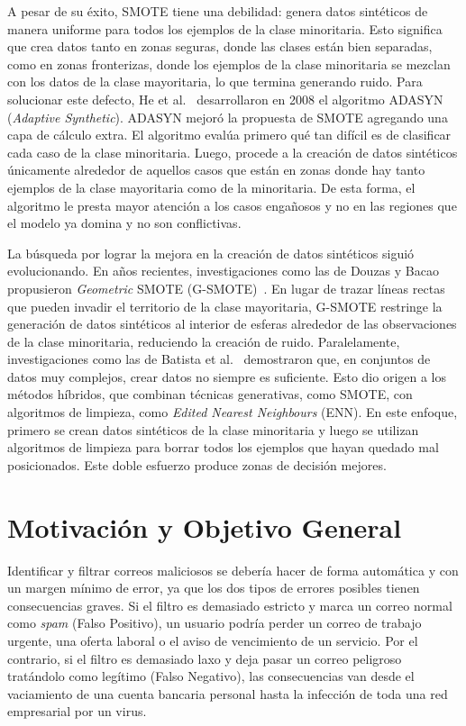 \documentclass[a4paper,11pt ,openany]{book}
\begin{document}
A pesar de su  éxito,  SMOTE tiene una debilidad: genera datos sintéticos de manera uniforme para todos los ejemplos de la clase minoritaria. Esto significa que crea datos tanto en zonas seguras, donde las clases están bien separadas, como en zonas fronterizas, donde los ejemplos de la clase minoritaria se mezclan con los datos de la clase mayoritaria, lo que  termina generando ruido.
Para solucionar este defecto, He et al.~\cite{he2008adasyn} desarrollaron en 2008 el algoritmo ADASYN (\textit{Adaptive Synthetic}). ADASYN mejoró la propuesta de SMOTE agregando una capa de cálculo extra. El algoritmo evalúa primero qué tan difícil es de clasificar cada caso de la clase minoritaria. Luego, procede a la creación de datos sintéticos únicamente alrededor de aquellos casos  que están en zonas donde hay tanto ejemplos de la clase mayoritaria como de la minoritaria. De esta forma, el algoritmo le presta mayor atención a los casos engañosos y no en las regiones que el modelo ya domina y no son conflictivas.


La búsqueda por lograr la mejora en la creación de datos sintéticos siguió evolucionando. En años recientes, investigaciones como las de Douzas y Bacao propusieron \textit{Geometric} SMOTE (G-SMOTE)~\cite{douzas2019gsmote}. En lugar de trazar líneas rectas que pueden invadir el territorio de la clase mayoritaria, G-SMOTE restringe la generación de datos sintéticos al interior de  esferas alrededor de las observaciones de la clase minoritaria, reduciendo la creación de ruido.
Paralelamente, investigaciones como las de Batista et al.~\cite{batista2004study} demostraron que, en conjuntos de datos muy complejos, crear datos no siempre es suficiente. Esto dio origen a los métodos híbridos, que combinan técnicas generativas, como SMOTE, con algoritmos de limpieza, como \textit{Edited Nearest Neighbours} (ENN). En este enfoque, primero se crean datos sintéticos de la clase minoritaria y luego se utilizan algoritmos de limpieza para borrar todos los ejemplos que hayan quedado mal posicionados. Este doble esfuerzo produce zonas de decisión mejores.

\section{Motivación y Objetivo General}

Identificar y filtrar correos maliciosos se debería hacer de forma automática y con un margen mínimo de error, ya que los dos tipos de errores posibles tienen consecuencias graves. Si el filtro es demasiado estricto y marca un correo normal como \textit{spam} (Falso Positivo), un usuario podría perder un correo de trabajo urgente, una oferta laboral o el aviso de vencimiento de un servicio. Por el contrario, si el filtro es demasiado laxo y deja pasar un correo peligroso tratándolo como legítimo (Falso Negativo), las consecuencias van desde el vaciamiento de una cuenta bancaria personal hasta la infección de toda una red empresarial por un virus. 
\end{document}
